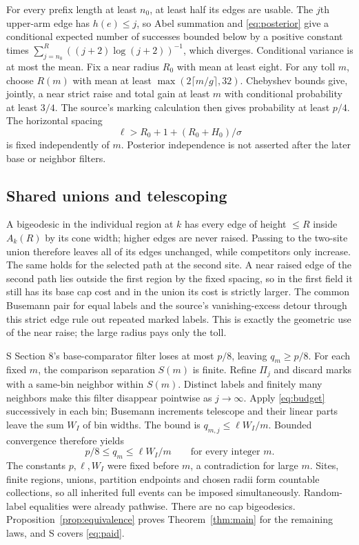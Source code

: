 For every prefix length at least $n_0$, at least half its edges are usable.
The $j$th upper-arm edge has $h(e)\le j$, so Abel summation and
\eqref{eq:posterior} give a conditional expected number of successes
bounded below by a positive constant times
$\sum_{j=n_0}^R((j+2)\log(j+2))^{-1}$, which diverges. Conditional
variance is at most the mean. Fix a near radius $R_0$ with mean at least
eight. For any toll $m$, choose $R(m)$ with mean at least
$\max(2\lceil m/g\rceil,32)$. Chebyshev bounds give, jointly, a near
strict raise and total gain at least $m$ with conditional probability at
least $3/4$. The source's marking calculation then gives probability at
least $p/4$. The horizontal spacing
\[
 \ell>R_0+1+(R_0+H_0)/\sigma
\]
is fixed independently of $m$. Posterior independence is not asserted
after the later base or neighbor filters.

\subsection{Shared unions and telescoping}
A bigeodesic in the individual region at $k$ has every edge of height
$\le R$ inside $A_k(R)$ by its cone width; higher edges are never raised.
Passing to the two-site union therefore leaves all of its edges unchanged,
while competitors only increase. The same holds for the selected path at
the second site. A near raised edge of the second path lies outside the
first region by the fixed spacing, so in the first field it still has its
base cap cost and in the union its cost is strictly larger. The common
Busemann pair for equal labels and the source's vanishing-excess detour
through this strict edge rule out repeated marked labels. This is exactly
the geometric use of the near raise; the large radius pays only the toll.

S Section 8's base-comparator filter loses at most $p/8$, leaving
$q_m\ge p/8$. For each fixed $m$, the comparison separation $S(m)$ is finite.
Refine $\Pi_j$ and discard marks with a same-bin neighbor within $S(m)$.
Distinct labels and finitely many neighbors make this filter disappear
pointwise as $j\to\infty$. Apply \eqref{eq:budget} successively in each
bin; Busemann increments telescope and their linear parts leave the sum
$W_I$ of bin widths. The bound is $q_{m,j}\le\ell W_I/m$. Bounded convergence
therefore yields
\[
             p/8\le q_m\le\ell W_I/m\qquad\text{for every integer }m.
\]
The constants $p,\ell,W_I$ were fixed before $m$, a contradiction for large
$m$. Sites, finite regions, unions, partition endpoints and chosen radii
form countable collections, so all inherited full events can be imposed
simultaneously. Random-label equalities were already pathwise.
There are no cap bigeodesics. Proposition~\ref{prop:equivalence} proves
Theorem~\ref{thm:main} for the remaining laws, and S covers \eqref{eq:paid}.
